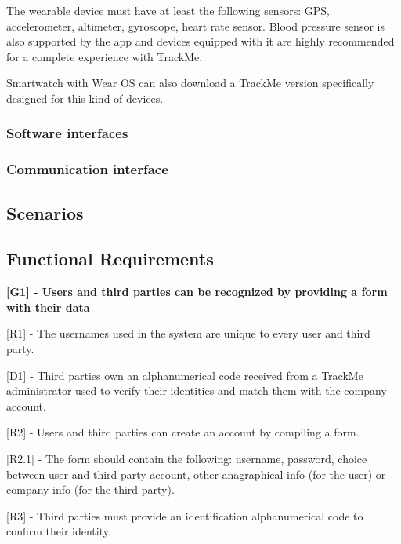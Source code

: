 The wearable device must have at least the following sensors: GPS, accelerometer, altimeter, gyroscope, heart rate sensor. Blood pressure sensor is also supported by the app and devices equipped with it are highly recommended for a complete experience with TrackMe.

Smartwatch with Wear OS can also download a TrackMe version specifically designed for this kind of devices.

\subsubsection{Software interfaces}
\subsubsection{Communication interface}
\subsection{Scenarios}

\subsection{Functional Requirements}
\hspace{-\parindent}\textbf{[G1] - Users and third parties can be recognized by providing a form with their data} \newline

[R1] -  The usernames used in the system are unique to every user and third party. \newline

[D1] - Third parties own an alphanumerical code received from a TrackMe administrator used to verify their identities and match them with the company account. \newline

[R2] - Users and third parties can create an account by compiling a form. \newline

\hspace{\parindent}[R2.1] - The form should contain the following: username, password, choice between user and third party account, other anagraphical info (for the user) or company info (for the third party). \newline

[R3] - Third parties must provide an identification alphanumerical code to confirm their identity. \newline

